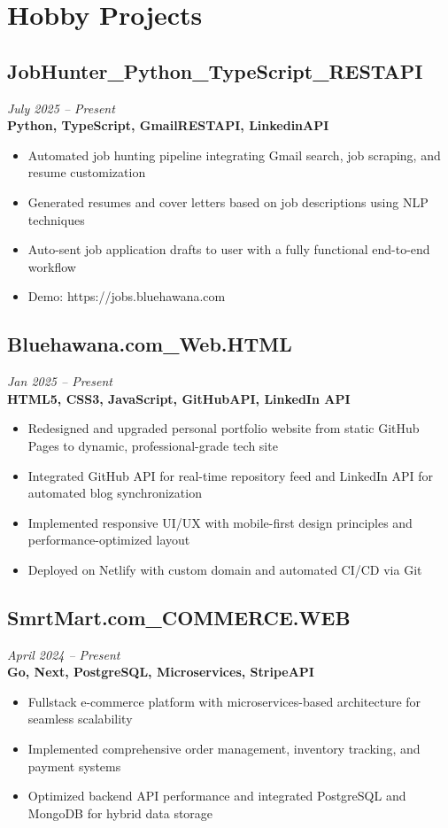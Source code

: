 \documentclass[11pt,a4paper]{article}
\begin{document}
\section*{Hobby Projects}
\subsection{JobHunter\_Python\_TypeScript\_RESTAPI}
\textit{July 2025 -- Present} \\
\textbf{Python, TypeScript, GmailRESTAPI, LinkedinAPI}
\begin{itemize}
\item Automated job hunting pipeline integrating Gmail search, job scraping, and resume customization
\item Generated resumes and cover letters based on job descriptions using NLP techniques
\item Auto-sent job application drafts to user with a fully functional end-to-end workflow
\item Demo: https://jobs.bluehawana.com
\end{itemize}

\subsection{Bluehawana.com\_Web.HTML}
\textit{Jan 2025 -- Present} \\
\textbf{HTML5, CSS3, JavaScript, GitHubAPI, LinkedIn API}
\begin{itemize}
\item Redesigned and upgraded personal portfolio website from static GitHub Pages to dynamic, professional-grade tech site
\item Integrated GitHub API for real-time repository feed and LinkedIn API for automated blog synchronization
\item Implemented responsive UI/UX with mobile-first design principles and performance-optimized layout
\item Deployed on Netlify with custom domain and automated CI/CD via Git
\end{itemize}

\subsection{SmrtMart.com\_COMMERCE.WEB}
\textit{April 2024 -- Present} \\
\textbf{Go, Next, PostgreSQL, Microservices, StripeAPI}
\begin{itemize}
\item Fullstack e-commerce platform with microservices-based architecture for seamless scalability
\item Implemented comprehensive order management, inventory tracking, and payment systems
\item Optimized backend API performance and integrated PostgreSQL and MongoDB for hybrid data storage
\end{itemize}
\end{document}
